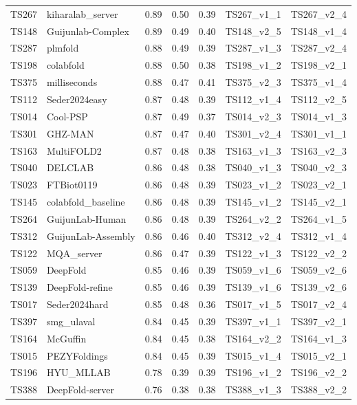 \begin{table}[ht]
{\begin{tabular}{llrrrll}
TS267 & kiharalab\_server & 0.89 & 0.50 & 0.39 & TS267\_v1\_1 & TS267\_v2\_4 \\ 
TS148 & Guijunlab-Complex & 0.89 & 0.49 & 0.40 & TS148\_v2\_5 & TS148\_v1\_4 \\ 
TS287 & plmfold & 0.88 & 0.49 & 0.39 & TS287\_v1\_3 & TS287\_v2\_4 \\ 
TS198 & colabfold & 0.88 & 0.50 & 0.38 & TS198\_v1\_2 & TS198\_v2\_1 \\ 
TS375 & milliseconds & 0.88 & 0.47 & 0.41 & TS375\_v2\_3 & TS375\_v1\_4 \\ 
TS112 & Seder2024easy & 0.87 & 0.48 & 0.39 & TS112\_v1\_4 & TS112\_v2\_5 \\ 
TS014 & Cool-PSP & 0.87 & 0.49 & 0.37 & TS014\_v2\_3 & TS014\_v1\_3 \\ 
TS301 & GHZ-MAN & 0.87 & 0.47 & 0.40 & TS301\_v2\_4 & TS301\_v1\_1 \\ 
TS163 & MultiFOLD2 & 0.87 & 0.48 & 0.38 & TS163\_v1\_3 & TS163\_v2\_3 \\ 
TS040 & DELCLAB & 0.86 & 0.48 & 0.38 & TS040\_v1\_3 & TS040\_v2\_3 \\ 
TS023 & FTBiot0119 & 0.86 & 0.48 & 0.39 & TS023\_v1\_2 & TS023\_v2\_1 \\ 
TS145 & colabfold\_baseline & 0.86 & 0.48 & 0.39 & TS145\_v1\_2 & TS145\_v2\_1 \\ 
TS264 & GuijunLab-Human & 0.86 & 0.48 & 0.39 & TS264\_v2\_2 & TS264\_v1\_5 \\ 
TS312 & GuijunLab-Assembly & 0.86 & 0.46 & 0.40 & TS312\_v2\_4 & TS312\_v1\_4 \\ 
TS122 & MQA\_server & 0.86 & 0.47 & 0.39 & TS122\_v1\_3 & TS122\_v2\_2 \\ 
TS059 & DeepFold & 0.85 & 0.46 & 0.39 & TS059\_v1\_6 & TS059\_v2\_6 \\ 
TS139 & DeepFold-refine & 0.85 & 0.46 & 0.39 & TS139\_v1\_6 & TS139\_v2\_6 \\ 
TS017 & Seder2024hard & 0.85 & 0.48 & 0.36 & TS017\_v1\_5 & TS017\_v2\_4 \\ 
TS397 & smg\_ulaval & 0.84 & 0.45 & 0.39 & TS397\_v1\_1 & TS397\_v2\_1 \\ 
TS164 & McGuffin & 0.84 & 0.45 & 0.38 & TS164\_v2\_2 & TS164\_v1\_3 \\ 
TS015 & PEZYFoldings & 0.84 & 0.45 & 0.39 & TS015\_v1\_4 & TS015\_v2\_1 \\ 
TS196 & HYU\_MLLAB & 0.78 & 0.39 & 0.39 & TS196\_v1\_2 & TS196\_v2\_2 \\ 
TS388 & DeepFold-server & 0.76 & 0.38 & 0.38 & TS388\_v1\_3 & TS388\_v2\_2 \\ 

\end{tabular}}
\end{table}
